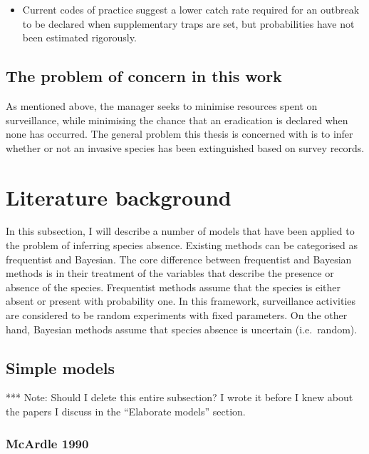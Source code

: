 \documentclass[
]{book}
\providecommand{\tightlist}{%
  \setlength{\itemsep}{0pt}\setlength{\parskip}{0pt}}
\begin{document}
\begin{itemize}
\tightlist
\item
  Current codes of practice suggest a lower catch rate required for an outbreak to be declared when supplementary traps are set, but probabilities have not been estimated rigorously.
\end{itemize}

\hypertarget{the-problem-of-concern-in-this-work}{%
\subsection{The problem of concern in this work}\label{the-problem-of-concern-in-this-work}}

As mentioned above, the manager seeks to minimise resources spent on surveillance, while minimising the chance that an eradication is declared when none has occurred. The general problem this thesis is concerned with is to infer whether or not an invasive species has been extinguished based on survey records.

\hypertarget{literature-background}{%
\section{Literature background}\label{literature-background}}

In this subsection, I will describe a number of models that have been applied to the problem of inferring species absence. Existing methods can be categorised as frequentist and Bayesian. The core difference between frequentist and Bayesian methods is in their treatment of the variables that describe the presence or absence of the species. Frequentist methods assume that the species is either absent or present with probability one. In this framework, surveillance activities are considered to be random experiments with fixed parameters. On the other hand, Bayesian methods assume that species absence is uncertain (i.e.~random).

\hypertarget{simple-models}{%
\subsection{Simple models}\label{simple-models}}

*** Note: Should I delete this entire subsection? I wrote it before I knew about the papers I discuss in the ``Elaborate models'' section.

\hypertarget{mcardle-1990}{%
\subsubsection{McArdle 1990}\label{mcardle-1990}}
\end{document}
